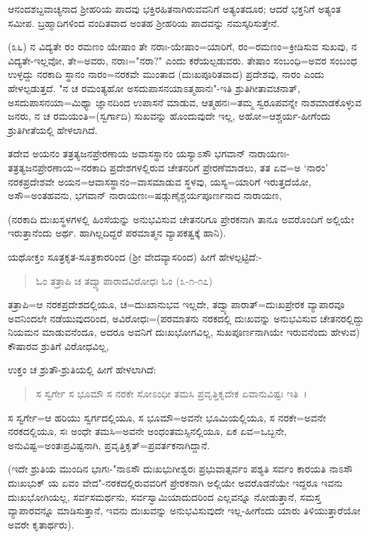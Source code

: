 
ಆನಂದಶಬ್ದವಾಚ್ಯನಾದ ಶ‍್ರೀಹರಿಯ ಪಾದವು ಭಕ್ತಿರಹಿತನಾಗಿರುವವನಿಗೆ ಅತ್ಯಂತದೂರ; ಆದರೆ ಭಕ್ತನಿಗೆ ಅತ್ಯಂತ ಸಮೀಪ. ಬ್ರಹ್ಮಾದಿಗಳಿಂದ ವಂದಿತವಾದ ಅಂತಹ ಶ‍್ರೀಹರಿಯ ಪಾದವನ್ನು ನಮಸ್ಕರಿಸುತ್ತೇನೆ.

(೩೬) ನ ವಿದ್ಯತೇ ರಂ ರಮಣಂ ಯೇಷಾಂ ತೇ ನರಾಃ-ಯೇಷಾಂ=ಯಾರಿಗೆ, ರಂ=ರಮಣಂ=ಕ್ರೀಡಿಸುವ ಸುಖವು, ನ ವಿದ್ಯತೇ-ಇಲ್ಲವೋ, ತೇ=ಅವರು, ನರಾಃ="ನರಾ?" ಎಂದು ಕರೆಯಲ್ಪಡುವರು. ತೇಷಾಂ ಸಂಬಂಧಿ=ಅವರ ಸಂಬಂಧ ಉಳ್ಳದ್ದು ನರಕಾದಿ ಸ್ಥಾನಂ ನಾರಂ=ನರಕವೇ ಮುಂತಾದ (ದುಃಖಪೂರಿತವಾದ) ಪ್ರದೇಶವು, ನಾರಂ ಎಂದು ಹೇಳಲ್ಪಡುತ್ತದೆ. "ನ ಚ ರಮಂತ್ಯಹೋ ಅಸದುಪಾಸನಯಾಽತ್ಮಹಾನಃ"-ಇತಿ ಶ್ರುತಿಗೀತಾವಚನಾತ್, ಅಸದುಪಾಸನಯಾ=ಮಿಥ್ಯಾ ಜ್ಞಾನದಿಂದ ಉಪಾಸನೆ ಮಾಡುವ, ಆತ್ಮಹನಃ=ತಮ್ಮ ಸ್ವರೂಪವನ್ನೇ ನಾಶಮಾಡಕೊಳ್ಳುವ ಜನರು, ನ ಚ ರಮಯಂತಿ=(ಸ್ವರ್ಗಾದಿ) ಸುಖವನ್ನು ಹೊಂದುವುದೇ ಇಲ್ಲ, ಅಹೋ=ಆಶ್ಚರ್ಯ-ಹೀಗೆಂದು ಶ್ರುತಿಗೀತೆಯಲ್ಲಿ ಹೇಳಲಾಗಿದೆ.

ತದೇವ ಅಯನಂ ತತ್ರತ್ಯಜನಪ್ರೇರಣಾಯ ಅವಾಸಸ್ಥಾನಂ ಯಸ್ಯಾಽಸೌ ಭಗವಾನ್ ನಾರಾಯಣಃ-ತತ್ರತ್ಯಜನಪ್ರೇರಣಾಯ=ನರಕಾದಿ ಪ್ರದೇಶಗಳಲ್ಲಿರುವ ಚೇತನರಿಗೆ ಪ್ರೇರಣೆಮಾಡಲು, ತತ ಏವ=ಅ `ನಾರಂ' ನರಕಪ್ರದೇಶವೇ ಅಯನ=ಆವಾಸಸ್ಥಾನಂ=ವಾಸಮಾಡುವ ಸ್ಥಳವು, ಯಸ್ಯ=ಯಾರಿಗೆ ಇರುತ್ತದೆಯೋ, ಅಸೌ=ಅಂತಹವನು, ಭಗವಾನ್ ನಾರಾಯಣಃ=ಷಡ್ಗುಣೈಶ್ಚರ್ಯಪೂರ್ಣನಾದ ನಾರಾಯಣ,

(ನರಕಾದಿ ದುಃಖಸ್ಥಳಗಳಲ್ಲಿ ಹಿಂಸೆಯನ್ನು ಅನುಭವಿಸುವ ಚೇತನರಿಗೂ ಪ್ರೇರಕನಾಗಿ ತಾನೂ ಅವರೊಂದಿಗೆ ಅಲ್ಲಿಯೇ ಇರುತ್ತಾನೆಂದು ಅರ್ಥ. ಹಾಗಿಲ್ಲದಿದ್ದರೆ ಪರಮಾತ್ಮನ ವ್ಯಾಪಕತ್ವಕ್ಕೆ ಹಾನಿ).

ಯಥೋಕ್ತಂ ಸೂತ್ರಕೃತ-ಸೂತ್ರಕಾರರಿಂದ (ಶ‍್ರೀ ವೇದವ್ಯಾಸರಿಂದ) ಹೀಗೆ ಹೇಳಲ್ಪಟ್ಟಿದೆ:-

\begin{verse}
ಓಂ ತತ್ರಾಪಿ ಚ ತದ್ವ್ಯಾಪಾರಾದವಿರೋಧಃ ಓಂ (೩-೧-೧೭)
\end{verse}

ತತ್ರಾಪಿ=ಆ ನರಕಪ್ರದೇಶದಲ್ಲಿಯೂ, ಚ=ದುಃಖಾನುಭವ ಇಲ್ಲದೇ, ತದ್ವ್ಯಾಪಾರಾತ್=ದುಃಖಪ್ರೇರಕ ವ್ಯಾಪಾರವೂ ಅವನಿಂದಲೇ ನಡೆಯುವುದರಿಂದ, ಅವಿರೋಧಃ=(ಪರಮಾತನು ನರಕದಲ್ಲಿ ದುಃಖವನ್ನು ಅನುಭವಿಸುವ ಚೇತನರಲ್ಲಿದ್ದು ನಿಯಮನ ಮಾಡುವನೆಂದೂ, ಅದರೂ ಅವನಿಗೆ ದುಃಖಭೋಗವಿಲ್ಲ, ಸುಖಪೂರ್ಣನಾಗಿಯೇ ಇರುವನೆಂದು ಹೇಳುವ) ಕೌಷಾರವ ಶ್ರುತಿಗೆ ವಿರೋಧವಿಲ್ಲ,

ಉಕ್ತಂ ಚ ಶ್ರುತೌ-ಶ್ರುತಿಯಲ್ಲಿ ಹೀಗೆ ಹೇಳಲಾಗಿದೆ:

\begin{verse}
ಸ ಸ್ವರ್ಗೇ ಸ ಭೂಮೌ ಸ ನರಕೇ ಸೋಽಂಧೀ ತಮಸಿ ಪ್ರವೃತ್ತಿಕೃದೇಕ ಏವಾನುವಿಷ್ಟಃ ಇತಿ~।
\end{verse}


ಸ ಸ್ವರ್ಗೇ=ಆ ಹರಿಯು ಸ್ವರ್ಗದಲ್ಲಿಯೂ, ಸ ಭೂಮೌ=ಅವನೇ ಭೂಮಿಯಲ್ಲಿಯೂ, ಸ ನರಕೇ=ಅವನೇ ನರಕದಲ್ಲಿಯೂ, ಸಃ ಅಂಧೇ ತಮಸಿ=ಅವನೇ ಅಂಧಂತಮಸ್ಸಿನಲ್ಲಿಯೂ, ಏಕ ಏವ=ಒಬ್ಬನೇ, ಅನುವಿಷ್ಟ=ಅಂತಃಪ್ರವಿಷ್ಟನಾಗಿ, ಪ್ರವೃತ್ತಿಕೃತ್=ಪ್ರವರ್ತಕನಾಗಿದ್ದಾನೆ.

(ಇದೇ ಶ್ರುತಿಯ ಮುಂದಿನ ಭಾಗಃ-"ನಾಽಸೌ ದುಃಖಭುಗೀಶ್ವರಃ ಪ್ರಭುವಾತ್ಸರ್ವಂ ಪಶ್ಯತಿ ಸರ್ವಂ ಕಾರಯತಿ ನಾಽಸೌ ದುಃಖಭುಕ್ ಯ ಏವಂ ವೇದ"-ನರಕದಲ್ಲಿರುವವರಿಗೆ ಪ್ರೇರಕನಾಗಿ ಅಲ್ಲಿಯೇ ಅವರೊಡನೆಯೇ ಇದ್ದರೂ ಇವನು ದುಃಖಭೋಗಿಯಲ್ಲ, ಸರ್ವಸಮರ್ಥನು, ಸರ್ವಸ್ವಾಮಿಯಾದುದರಿಂದ ಎಲ್ಲವನ್ನೂ ನೋಡುತ್ತಾನೆ, ಸಮಸ್ತ ವ್ಯಾಪಾರವನ್ನೂ ಮಾಡಿಸುತ್ತಾನೆ, ಇವನು ದುಃಖವನ್ನು ಅನುಭವಿಸುವುದೇ ಇಲ್ಲ-ಹೀಗೆಂದು ಯಾರು ತಿಳಿಯುತ್ತಾರೆಯೋ ಅವರೇ ಕೃತಾರ್ಥರು).

